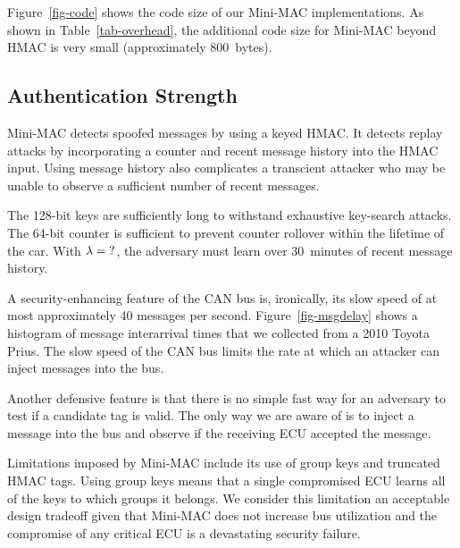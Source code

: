 Figure~\ref{fig-code} shows the code size of our Mini-MAC implementations.
As shown in Table~\ref{tab-overhead}, the additional code size for Mini-MAC beyond
HMAC is very small (approximately 800~bytes).





	
\subsection{Authentication Strength}
\label{security}

Mini-MAC detects spoofed messages by using a keyed HMAC.  It detects replay attacks
by incorporating a counter and recent message history into the HMAC input.  Using message
history also complicates a transcient attacker who may be unable to observe a sufficient
number of recent messages.  

The 128-bit keys are sufficiently long to withstand 
exhaustive key-search attacks.  The 64-bit counter is sufficient to prevent counter
rollover within the lifetime of the car.
With $\lambda = \hbox{?}$, the adversary must learn over 30~minutes of recent
message history.

A security-enhancing feature of the CAN bus is, ironically, its slow speed of at most
approximately 40 messages per second.  Figure~\ref{fig-msgdelay} shows a histogram of
message interarrival times that we collected from a 2010 Toyota Prius.
The slow speed of the CAN bus limits the rate at which an attacker can
inject messages into the bus.

Another defensive feature is that there is no simple fast way for an adversary to
test if a candidate tag is valid.   The only way we are aware of is to inject a message into the bus
and observe if the receiving ECU accepted the message.

Limitations imposed by Mini-MAC include its use of group keys and truncated HMAC tags.  
Using group keys means that a single compromised ECU learns all of the keys
to which groups it belongs.  We consider this limitation an acceptable design tradeoff
given that Mini-MAC does not increase bus utilization and the compromise of any critical
ECU is a devastating security failure.

